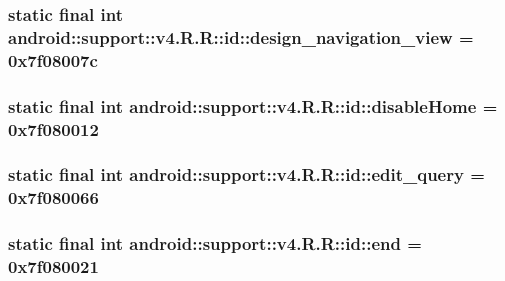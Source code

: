 \hypertarget{classandroid_1_1support_1_1v4_1_1_r_1_1id_6ba6499a99dc998240dd51eafb28325a}{
\subsubsection[{design\_\-navigation\_\-view}]{\setlength{\rightskip}{0pt plus 5cm}static final int android::support::v4.R.R::id::design\_\-navigation\_\-view = 0x7f08007c}}
\label{classandroid_1_1support_1_1v4_1_1_r_1_1id_6ba6499a99dc998240dd51eafb28325a}


\hypertarget{classandroid_1_1support_1_1v4_1_1_r_1_1id_c30546a20a8222c5bd1b45d3c731137c}{
\subsubsection[{disableHome}]{\setlength{\rightskip}{0pt plus 5cm}static final int android::support::v4.R.R::id::disableHome = 0x7f080012}}
\label{classandroid_1_1support_1_1v4_1_1_r_1_1id_c30546a20a8222c5bd1b45d3c731137c}


\hypertarget{classandroid_1_1support_1_1v4_1_1_r_1_1id_c1381b0bdbb2baefbb1627b03b168924}{
\subsubsection[{edit\_\-query}]{\setlength{\rightskip}{0pt plus 5cm}static final int android::support::v4.R.R::id::edit\_\-query = 0x7f080066}}
\label{classandroid_1_1support_1_1v4_1_1_r_1_1id_c1381b0bdbb2baefbb1627b03b168924}


\hypertarget{classandroid_1_1support_1_1v4_1_1_r_1_1id_e30e59c14142226ef54b4047de3e9908}{
\subsubsection[{end}]{\setlength{\rightskip}{0pt plus 5cm}static final int android::support::v4.R.R::id::end = 0x7f080021}}
\label{classandroid_1_1support_1_1v4_1_1_r_1_1id_e30e59c14142226ef54b4047de3e9908}


